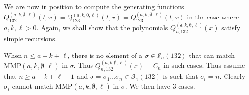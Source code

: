 \documentclass[
final,nomarks
]{dmtcs-episciences}
\newcommand{\Sn}[1]{\mathcal{S}_{#1}}
\newcommand{\Qmm}[1]{Q_{132}^{(#1)}(t,x)}
\newcommand{\Qm}[1]{Q_{123}^{(#1)}(t,x)}
\newcommand{\Qmmn}[2]{Q_{#2,132}^{(#1)}(x)}
\newcommand{\MMP}{\mathrm{MMP}}
\begin{document}
We are now in position to compute the generating functions 
\begin{math}\Qmm{a,k,\emptyset,\ell}=\Qm{a,k,0,\ell}=\Qm{a,k,\emptyset,\ell}\end{math} in the case where 
\begin{math}a,k, \ell > 0\end{math}. 
Again, we shall show that the polynomials \begin{math}\Qmmn{a,k,\emptyset,\ell}{n}\end{math} satisfy simple recursions. 



When \begin{math}n \leq a+k+\ell\end{math}, there is no element of a \begin{math}\sigma \in \Sn{n}(132)\end{math} that 
can match \begin{math}\MMP(a,k,\emptyset,\ell)\end{math} in \begin{math}\sigma\end{math}. Thus \begin{math}\Qmmn{a,k,\emptyset,\ell}{n} = C_n\end{math} 
in such cases. Thus assume that \begin{math}n \geq a+k+\ell +1\end{math} and \begin{math}\sigma =\sigma_1 \ldots \sigma_n \in 
\Sn{n}(132)\end{math} is such that \begin{math}\sigma_i =n\end{math}. Clearly \begin{math}\sigma_i\end{math} cannot match 
\begin{math}\MMP(a,k,\emptyset,\ell)\end{math} in \begin{math}\sigma\end{math}. We then have 3 cases. 
\end{document}
